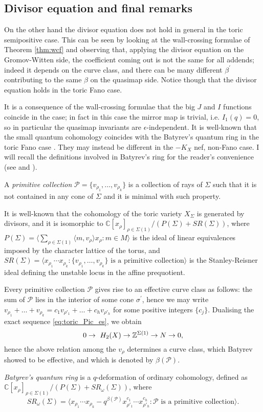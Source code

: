 \subsection{Divisor equation and final remarks}\label{sec:Batyrev} On the other hand the divisor equation does not hold in general in the toric semipositive case. This can be seen by looking at the wall-crossing formulae of Theorem \ref{thm:wcf} and observing that, applying the divisor equation on the Gromov-Witten side, the coefficient coming out is not the same for all addends; indeed it depends on the curve class, and there can be many different $\beta^\prime$ contributing to the same $\beta$ on the quasimap side. Notice though that the divisor equation holds in the toric Fano case.

It is a consequence of the wall-crossing formulae that the big $J$ and $I$ functions coincide in the  case; in fact in this case the mirror map is trivial, i.e. $I_1(q)=0$, so in particular the quasimap invariants are $\epsilon$-independent. It is well-known that the small quantum cohomology coincides with the Batyrev's quantum ring in the toric Fano case \cite[Example 11.2.5.2]{MS}. They may instead be different in the $-K_X$ nef, non-Fano case. I will recall the definitions involved in Batyrev's ring for the reader's convenience (see \cite{Batyrev} and \cite[Example 8.1.2.2]{MS}).
\begin{definition}
 A \emph{primitive collection} $\mathcal P=\{v_{\rho_1},\ldots,v_{\rho_k}\}$ is a collection of rays of $\Sigma$ such that it is not contained in any cone of $\Sigma$ and it is minimal with such property.
 
 It is well-known that the cohomology of the toric variety $X_\Sigma$ is generated by divisors, and it is isomorphic to $\mathbb C[x_\rho]_{\rho\in\Sigma(1)}/(P(\Sigma)+SR(\Sigma))$, where $P(\Sigma)=\langle \sum_{\rho\in\Sigma(1)}\langle m,v_\rho\rangle x_\rho : m\in M\rangle$ is the ideal of linear equivalences imposed by the character lattice of the torus, and $SR(\Sigma)=\langle x_{\rho_1}\cdots x_{\rho_k} : \{v_{\rho_1},\ldots,v_{\rho_k}\} \text{ is a primitive collection}\rangle$ is the Stanley-Reisner ideal defining the unstable locus in the affine prequotient.
 
 Every primitive collection $\mathcal P$ gives rise to an effective curve class as follows: the sum of $\mathcal P$ lies in the interior of some cone $\sigma^\prime$, hence we may write $v_{\rho_1}+\ldots+v_{\rho_k}=c_{1}v_{\rho'_1}+\ldots+c_{h}v_{\rho'_h}$ for some positive integers $\{c_j\}$. Dualising the exact sequence \eqref{eq:toric_Pic_es}, we obtain \[0\rightarrow\ H_2(X)\rightarrow \mathbb{Z}^{\Sigma(1)}\rightarrow N\rightarrow 0,\] hence the above relation among the $v_\rho$ determines a curve class, which Batyrev showed to be effective, and which is denoted by $\beta(\mathcal P)$.
 
 \emph{Batyrev's quantum ring} is a $q$-deformation of ordinary cohomology, defined as $\mathbb C[x_\rho]_{\rho\in\Sigma(1)}/(P(\Sigma)+SR_\omega(\Sigma))$, where \[SR_\omega(\Sigma)=\langle x_{\rho_1}\cdots x_{\rho_k}-q^{\beta(\mathcal P)}x_{\rho'_1}^{c_1}\cdots x_{\rho'_h}^{c_h} : \mathcal P\text{ is a primitive collection}\rangle.\]
\end{definition}

